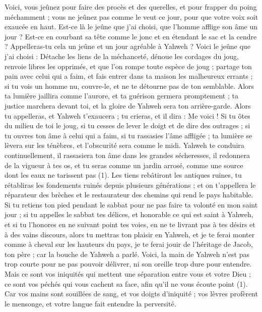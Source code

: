 \begin{multicols}{2}
Voici, vous jeûnez pour faire des procès et des querelles, et pour frapper du poing méchamment ; vous ne jeûnez pas comme le veut ce jour, pour que votre voix soit exaucée en haut.
Est-ce là le jeûne que j'ai choisi, que l'homme afflige son âme un jour ? Est-ce en courbant sa tête comme le jonc et en étendant le sac et la cendre ? Appelleras-tu cela un jeûne et un jour agréable à Yahweh ?
Voici le jeûne que j'ai choisi : Détache les liens de la méchanceté, dénoue les cordages du joug, renvoie libres les opprimés, et que l’on rompe toute espèce de joug ;
partage ton pain avec celui qui a faim, et fais entrer dans ta maison les malheureux errants ; si tu vois un homme nu, couvre-le, et ne te détourne pas de ton semblable.
Alors ta lumière jaillira comme l’aurore, et ta guérison germera promptement ; ta justice marchera devant toi, et la gloire de Yahweh sera ton arrière-garde.
Alors tu appelleras, et Yahweh t'exaucera ; tu crieras, et il dira : Me voici ! Si tu ôtes du milieu de toi le joug, si tu cesses de lever le doigt et de dire des outrages ;
si tu ouvres ton âme à celui qui a faim, si tu rassasies l'âme affligée ; ta lumière se lèvera sur les ténèbres, et l’obscurité sera comme le midi.
Yahweh te conduira continuellement, il rassasiera ton âme dans les grandes sécheresses, il redonnera de la vigueur à tes os, et tu seras comme un jardin arrosé, comme une source dont les eaux ne tarissent pas (1).
Les tiens rebâtiront les antiques ruines, tu rétabliras les fondements ruinés depuis plusieurs générations ; et on t'appellera le réparateur des brèches et le restaurateur des chemins qui rend le pays habitable.
Si tu retiens ton pied pendant le sabbat pour ne pas faire ta volonté en mon saint jour ; si tu appelles le sabbat tes délices, et honorable ce qui est saint à Yahweh, et si tu l'honores en ne suivant point tes voies, en ne te livrant pas à tes désirs et à des vains discours,
alors tu mettras ton plaisir en Yahweh, et je te ferai monter comme à cheval sur les hauteurs du pays, je te ferai jouir de l’héritage de Jacob, ton père ; car la bouche de Yahweh a parlé.
\VerseOne{}Voici, la main de Yahweh n'est pas trop courte pour ne pas pouvoir délivrer, ni son oreille trop dure pour entendre.
Mais ce sont vos iniquités qui mettent une séparation entre vous et votre Dieu ; ce sont vos péchés qui vous cachent sa face, afin qu'il ne vous écoute point (1).
Car vos mains sont souillées de sang, et vos doigts d'iniquité ; vos lèvres profèrent le mensonge, et votre langue fait entendre la perversité.

\end{multicols}
